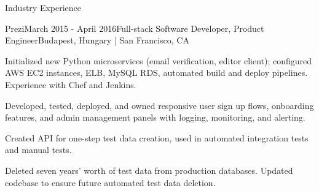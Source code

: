 \documentclass{resume} %
\begin{document}
\begin{rSection}{Industry Experience}

%
%


\begin{rSubsection}{Prezi}{March 2015 - April 2016}{Full-stack Software Developer, Product Engineer}{Budapest, Hungary | San Francisco, CA}
\item Initialized new Python microservices (email verification, editor client); configured AWS EC2 instances, ELB, MySQL RDS, automated build and deploy pipelines. Experience with Chef and Jenkins.
\item Developed, tested, deployed, and owned responsive user sign up flows, onboarding features, and admin management panels with logging, monitoring, and alerting.
\item Created API for one-step test data creation, used in automated integration tests and manual tests.
\item Deleted seven years' worth of test data from production databases. Updated codebase to ensure future automated test data deletion.


\end{rSubsection}



\end{rSection}
\end{document}

